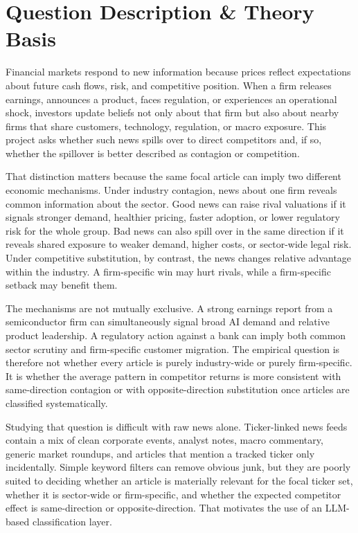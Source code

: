 \documentclass[11pt]{article}
\begin{document}
\section{Question Description \& Theory Basis}

Financial markets respond to new information because prices reflect expectations about future cash flows, risk, and competitive position. When a firm releases earnings, announces a product, faces regulation, or experiences an operational shock, investors update beliefs not only about that firm but also about nearby firms that share customers, technology, regulation, or macro exposure. This project asks whether such news spills over to direct competitors and, if so, whether the spillover is better described as contagion or competition.

That distinction matters because the same focal article can imply two different economic mechanisms. Under industry contagion, news about one firm reveals common information about the sector. Good news can raise rival valuations if it signals stronger demand, healthier pricing, faster adoption, or lower regulatory risk for the whole group. Bad news can also spill over in the same direction if it reveals shared exposure to weaker demand, higher costs, or sector-wide legal risk. Under competitive substitution, by contrast, the news changes relative advantage within the industry. A firm-specific win may hurt rivals, while a firm-specific setback may benefit them.

The mechanisms are not mutually exclusive. A strong earnings report from a semiconductor firm can simultaneously signal broad AI demand and relative product leadership. A regulatory action against a bank can imply both common sector scrutiny and firm-specific customer migration. The empirical question is therefore not whether every article is purely industry-wide or purely firm-specific. It is whether the average pattern in competitor returns is more consistent with same-direction contagion or with opposite-direction substitution once articles are classified systematically.

Studying that question is difficult with raw news alone. Ticker-linked news feeds contain a mix of clean corporate events, analyst notes, macro commentary, generic market roundups, and articles that mention a tracked ticker only incidentally. Simple keyword filters can remove obvious junk, but they are poorly suited to deciding whether an article is materially relevant for the focal ticker set, whether it is sector-wide or firm-specific, and whether the expected competitor effect is same-direction or opposite-direction. That motivates the use of an LLM-based classification layer.
\end{document}
